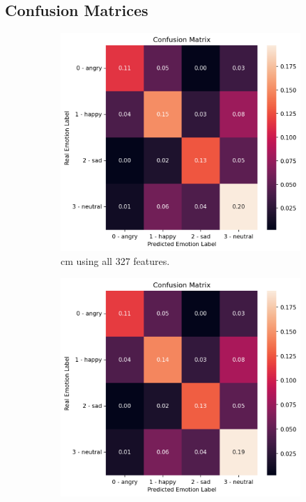 \subsection{Confusion Matrices}  \label{confusionMatrices}

\begin{figure}[H]
	\begin{subfigure}{.5\textwidth}
		\centering
		\includegraphics[width=\linewidth]{figs/appendix/feature_selection/cmAll.png}
		\caption{\ac{cm} using all 327 features.}
	\end{subfigure}%
	\begin{subfigure}{.5\textwidth}
		\centering
		\includegraphics[width=\linewidth]{figs/appendix/feature_selection/cmSec.png}

\end{subfigure}
\end{figure}

